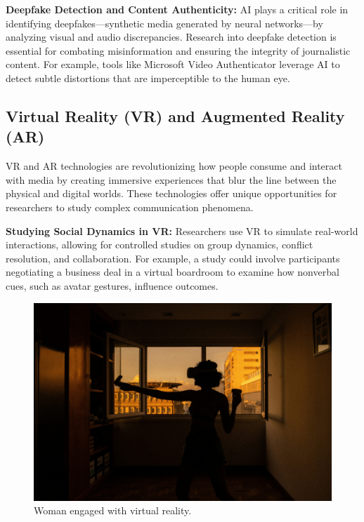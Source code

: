 \documentclass[
]{book}
\begin{document}
\textbf{Deepfake Detection and Content Authenticity:} AI plays a critical role in identifying deepfakes---synthetic media generated by neural networks---by analyzing visual and audio discrepancies. Research into deepfake detection is essential for combating misinformation and ensuring the integrity of journalistic content. For example, tools like Microsoft Video Authenticator leverage AI to detect subtle distortions that are imperceptible to the human eye.

\subsection{Virtual Reality (VR) and Augmented Reality (AR)}\label{virtual-reality-vr-and-augmented-reality-ar}

VR and AR technologies are revolutionizing how people consume and interact with media by creating immersive experiences that blur the line between the physical and digital worlds. These technologies offer unique opportunities for researchers to study complex communication phenomena.

\textbf{Studying Social Dynamics in VR:} Researchers use VR to simulate real-world interactions, allowing for controlled studies on group dynamics, conflict resolution, and collaboration. For example, a study could involve participants negotiating a business deal in a virtual boardroom to examine how nonverbal cues, such as avatar gestures, influence outcomes.

\begin{figure}
\centering
\includegraphics[width=1\textwidth,height=\textheight]{images/virtual-reality.jpg}
\caption{Woman engaged with virtual reality.}
\end{figure}
\end{document}
